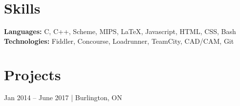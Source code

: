 \documentclass[]{formatting}
\begin{document}

%
%



\section{Skills}
\begin{flushleft} \textbf{Languages:} 
\textcolor{know} {C}, \space
\textcolor{know} {C++}, \space
\textcolor{know} {Scheme}, \space 
\textcolor{know} {MIPS}, \space
\textcolor{know} {\LaTeX}, \space
\textcolor{know} {Javascript}, \space
\textcolor{know} {HTML}, \space
\textcolor{know} {CSS}, \space
\textcolor{know} {Bash} \\
\vskip 5pt
\textbf{Technologies:} 
\textcolor{know} {Fiddler}, \space
\textcolor{know} {Concourse}, \space
\textcolor{know} {Loadrunner}, \space
\textcolor{know} {TeamCity}, \space
\textcolor{know} {CAD/CAM}, \space
\textcolor{know} {Git}
\end{flushleft}

\sectionsep


\section{Projects}

\begin{tightemize}
\item 
\item
\item
\end{tightemize}
\sectionsep

 {Jan 2014 – June 2017 | Burlington, ON}
\begin{tightemize}
\item 
\item
\item
\end{tightemize}
\sectionsep
\end{document}
